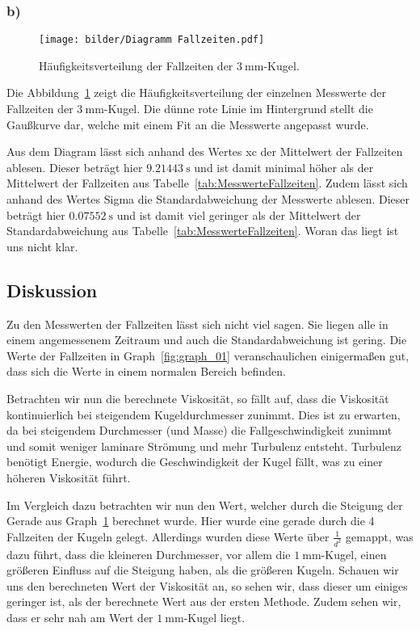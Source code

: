             \subsubsection{b)}

            \begin{figure}[H]
                \centering
                \texttt{[image: bilder/Diagramm Fallzeiten.pdf]}
                \caption{Häufigkeitsverteilung der Fallzeiten der $3\ \mathrm{mm}$-Kugel.}
                \label{fig:graph_02}
            \end{figure}

            Die Abbildung~\ref{fig:graph_02} zeigt die Häufigkeitsverteilung der einzelnen Messwerte der Fallzeiten der $3\ \mathrm{mm}$-Kugel. Die dünne rote Linie im Hintergrund stellt die Gaußkurve dar, welche mit einem Fit an die Messwerte angepasst wurde.

            Aus dem Diagram lässt sich anhand des Wertes xc der Mittelwert der Fallzeiten ablesen. Dieser beträgt hier $9.21443\ \mathrm{s}$ und ist damit minimal höher als der Mittelwert der Fallzeiten aus Tabelle~\ref{tab:MesswerteFallzeiten}. Zudem lässt sich anhand des Wertes Sigma die Standardabweichung der Messwerte ablesen. Dieser beträgt hier $0.07552\ \mathrm{s}$ und ist damit viel geringer als der Mittelwert der Standardabweichung aus Tabelle~\ref{tab:MesswerteFallzeiten}. Woran das liegt ist uns nicht klar.

        \subsection{Diskussion}

            Zu den Messwerten der Fallzeiten lässt sich nicht viel sagen. Sie liegen alle in einem angemessenem Zeitraum und auch die Standardabweichung ist gering. Die Werte der Fallzeiten in Graph~\ref{fig:graph_01} veranschaulichen einigermaßen gut, dass sich die Werte in einem normalen Bereich befinden.

            Betrachten wir nun die berechnete Viskosität, so fällt auf, dass die Viskosität kontinuierlich bei steigendem Kugeldurchmesser zunimmt. Dies ist zu erwarten, da bei steigendem Durchmesser (und Masse) die Fallgeschwindigkeit zunimmt und somit weniger laminare Strömung und mehr Turbulenz entsteht. Turbulenz benötigt Energie, wodurch die Geschwindigkeit der Kugel fällt, was zu einer höheren Viskosität führt.

            Im Vergleich dazu betrachten wir nun den Wert, welcher durch die Steigung der Gerade aus Graph~\ref{fig:graph_02} berechnet wurde. Hier wurde eine gerade durch die 4 Fallzeiten der Kugeln gelegt. Allerdings wurden diese Werte über $\frac{1}{d^{2}}$ gemappt, was dazu führt, dass die kleineren Durchmesser, vor allem die $1\ \mathrm{mm}$-Kugel, einen größeren Einfluss auf die Steigung haben, als die größeren Kugeln. Schauen wir uns den berechneten Wert der Viskosität an, so sehen wir, dass dieser um einiges geringer ist, als der berechnete Wert aus der ersten Methode. Zudem sehen wir, dass er sehr nah am Wert der $1\ \mathrm{mm}$-Kugel liegt.

